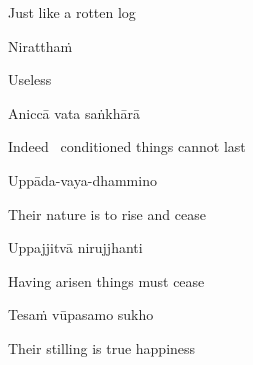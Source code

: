\begin{english}
  Just like a rotten log
\end{english}

Niratthaṁ

\begin{english}
  Useless
\end{english}

\suttaRef{[Dhp 41]}

Aniccā vata saṅkhārā

\begin{english}
  Indeed \breathmark\ conditioned things cannot last
\end{english}

Uppāda-vaya-dhammino

\begin{english}
  Their nature is to rise and cease
\end{english}

Uppajjitvā nirujjhanti

\begin{english}
  Having arisen things must cease
\end{english}

Tesaṁ vūpasamo sukho

\begin{english}
  Their stilling is true happiness
\end{english}

\suttaRef{[Trad]}

